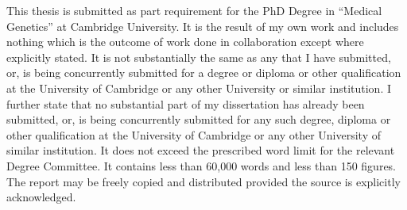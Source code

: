 
\begin{declaration}

This thesis is submitted as part requirement for the PhD Degree in ``Medical Genetics'' at Cambridge University.
It is the result of my own work and includes nothing which is the outcome of work done in collaboration except where explicitly stated.
It is not substantially the same as any that I have submitted, or, is being concurrently submitted for a degree or diploma or other qualification at the University of Cambridge or any other University or similar institution.
I further state that no substantial part of my dissertation has already been submitted, or, is being concurrently submitted for any such degree, diploma or other qualification at the University of Cambridge or any other University of similar institution.
It does not exceed the prescribed word limit for the relevant Degree Committee.
It contains less than 60,000 words and less than 150 figures.
The report may be freely copied and distributed provided the source is explicitly acknowledged.

\end{declaration}

